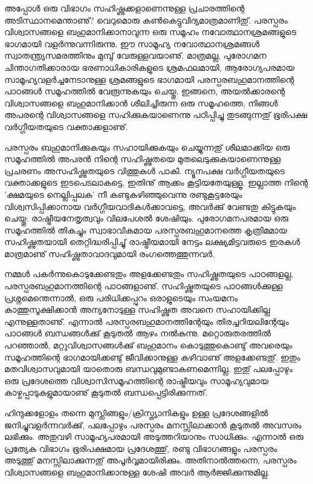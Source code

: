 അപ്പോള്‍ ഒരു വിഭാഗം സഹിഷ്ണുക്കളാണെന്നുള്ള പ്രചാരത്തിന്റെ അടിസ്ഥാനമെന്താണു്? വെറുമൊരു കണ്‍കെട്ടുവിദ്യമാത്രമാണിതു്. 
പരസ്പരം വിശ്വാസങ്ങളെ ബഹുമാനിക്കാനാവുന്ന ഒരു സമൂഹം നവോത്ഥാനശ്രമങ്ങളുടെ ഭാഗമായി വളര്‍ന്നുവന്നിരുന്നു. ഈ സാമൂഹ്യ 
നവോത്ഥാനശ്രമങ്ങള്‍ സ്വാതന്ത്ര്യസമരത്തിനും മുമ്പു് വേരുള്ളവയാണു്. മാത്രമല്ല, പുരോഗമന ചിന്താഗതിക്കാരായ ഭരണാധികാരികളുടെ
 ശ്രമഫലമായി, ആരോഗ്യപരമായ സാമൂഹ്യവളര്‍ച്ചനേടാനുള്ള ശ്രമങ്ങളുടെ ഭാഗമായി പരസ്പരബഹുമാനത്തിന്റെ പാഠങ്ങള്‍ സമൂഹത്തില്‍ 
 വേരൂന്നുകയും ചെയ്തു. ഇങ്ങനെ, അയല്‍ക്കാരന്റെ വിശ്വാസങ്ങളെ ബഹുമാനിക്കാന്‍ ശീലിച്ചിരുന്ന ഒരു സമൂഹത്തെ, നിങ്ങള്‍ 
 അപരന്റെ വിശ്വാസങ്ങളെ സഹിക്കുകയാണെന്നു പഠിപ്പിച്ചു തുടങ്ങുന്നതു് ഭൂരിപക്ഷ വര്‍ഗ്ഗീയതയുടെ വക്താക്കളാണു്.

പരസ്പരം ബഹുമാനിക്കുകയും സഹായിക്കുകയും ചെയ്യുന്നതു് ശീലമാക്കിയ ഒരു സമൂഹത്തില്‍ അപരന്‍ നിന്റെ സഹിഷ്ണുതയെ 
മുതലെടുക്കുകയാണെന്നുള്ള പ്രചരണം അസഹിഷ്ണുതയുടെ വിത്തുകള്‍ പാകി. ന്യൂനപക്ഷ വര്‍ഗ്ഗീയതയുടെ വക്താക്കളുടെ ഇടപെടലാകട്ടെ, 
ഇതിനു് ആക്കം കൂട്ടിയതേയുള്ളൂ. ഇല്ലാത്ത നിന്റെ 'ക്ഷമയുടെ നെല്ലിപ്പലക' നീ കണ്ടുകഴിഞ്ഞുവെന്നു രണ്ടുകൂട്ടരേയും വിശ്വസിപ്പിക്കാനായ
 വര്‍ഗ്ഗീയവാദികള്‍ക്കാവട്ടെ, അവര്‍ക്കു് വേണ്ടതു കിട്ടുകയും ചെയ്തു: രാഷ്ട്രീയനേതൃത്വവും വിലപേശല്‍ ശേഷിയും. പുരോഗമനപരമായ
  ഒരു സമൂഹത്തില്‍ തികച്ചും സ്വാഭാവികമായ പരസ്പരബഹുമാനത്തെ കൃത്രിമമായ സഹിഷ്ണുതയായി തെറ്റിദ്ധരിപ്പിച്ചു് രാഷ്ട്രീയമായി 
  നേട്ടം ലക്ഷ്യമിട്ടവരുടെ ഇരകള്‍ മാത്രമാണു് സഹിഷ്ണുതാവാദവുമായി രംഗത്തെത്തുന്നവര്‍.

നമ്മള്‍ പകര്‍ന്നുകൊടുക്കേണ്ടതും അളക്കേണ്ടതും സഹിഷ്ണുതയുടെ പാഠങ്ങളല്ല, പരസ്പരബഹുമാനത്തിന്റെ പാഠങ്ങളാണു്. സഹിഷ്ണുതയുടെ 
പാഠങ്ങള്‍ക്കുള്ള പ്രശ്നമെന്തെന്നാല്‍, ഒരു പരിധിക്കപ്പുറം ഒരാളുടെയും സംയമനം കാത്തുസൂക്ഷിക്കാന്‍ അന്യനോടുള്ള സഹിഷ്ണുത 
അവനെ സഹായിക്കില്ല എന്നുള്ളതാണു്. എന്നാല്‍ പരസ്പരബഹുമാനത്തിന്റേയും തിരച്ചറിയലിന്റേയും പാഠങ്ങള്‍ ബന്ധങ്ങള്‍ക്കു് കൂടുതല്‍ ആഴം നല്‍കുന്നു. മറ്റൊരുതരത്തില്‍ പറഞ്ഞാല്‍, മറ്റുവിശ്വാസങ്ങള്‍ക്കു്  ബഹുമാനം കൊടുത്തുകൊണ്ടു് അവരെയും സമൂഹത്തിന്റെ 
ഭാഗമായിക്കണ്ടു് ജീവിക്കാനുള്ള കഴിവാണു് അളക്കേണ്ടതു്. ഇതും മതവിശ്വാസവുമായി യാതൊരു ബന്ധവുമുണ്ടാകണമെന്നില്ല. ഇതു് 
പലപ്പോഴും ഒരു പ്രദേശത്തെ വിശ്വാസിസമൂഹത്തിന്റെ രാഷ്ട്രീയവും സാമൂഹ്യവുമായ കാഴ്ചപ്പാടുകളുമായാണു് കൂടുതല്‍ ബന്ധപ്പെട്ടിരിക്കുന്നത്.

ഹിന്ദുക്കളോളം തന്നെ മുസ്ലിങ്ങളും/ക്രിസ്ത്യാനികളും ഉള്ള പ്രദേശങ്ങളില്‍ ജനിച്ചുവളര്‍ന്നവര്‍ക്കു്, പലപ്പോഴും പരസ്പരം മനസ്സിലാക്കാന്‍ 
കൂടുതല്‍ അവസരം ലഭിക്കും. അതുവഴി സാമൂഹ്യപരമായി അടുത്തറിയാനും സാധിക്കും. എന്നാല്‍ ഒരു പ്രത്യേക വിഭാഗം ഭൂരിപക്ഷമായ
 പ്രദേശത്തു്, രണ്ടു വിഭാഗങ്ങളും പരസ്പരം അടുത്തു് മനസ്സിലാക്കുന്നതു് അപൂര്‍വ്വമായിരിക്കും. അതിനാല്‍ത്തന്നെ, പരസ്പരം വിശ്വാസങ്ങളെ
  ബഹുമാനിക്കാനുള്ള ശേഷി അവര്‍ ആര്‍ജ്ജിക്കുന്നുമില്ല.

